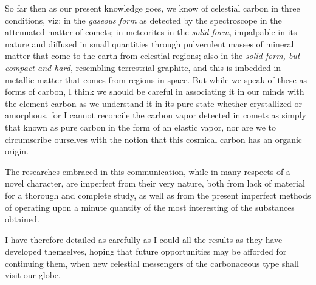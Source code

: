 \documentclass[a4paper, 11pt, oneside, english]{article}
\begin{document}
So far then as our present knowledge goes, we know of celestial carbon in three conditions, viz: in the \emph{gaseous form} as detected by the spectroscope in the attenuated matter of comets; in meteorites in the \emph{solid form}, impalpable in its nature and diffused in small quantities through pulverulent masses of mineral matter that come to the earth from celestial regions; also in the \emph{solid form, but compact and hard}, resembling terrestrial graphite, and this is imbedded in metallic matter that comes from regions in space. But while we speak of these as forms of carbon, I think we should be careful in associating it in our minds with the element carbon as we understand it in its pure state whether crystallized or amorphous, for I cannot reconcile the carbon vapor detected in comets as simply that known as pure carbon in the form of an elastic vapor, nor are we to circumscribe ourselves with the notion that this cosmical carbon has an organic origin.

The researches embraced in this communication, while in many respects of a novel character, are imperfect from their very nature, both from lack of material for a thorough and complete study, as well as from the present imperfect methods of operating upon a minute quantity of the most interesting of the substances obtained.

I have therefore detailed as carefully as I could all the results as they have developed themselves, hoping that future opportunities may be afforded for continuing them, when new celestial messengers of the carbonaceous type shall visit our globe.
\clearpage
\end{document}
